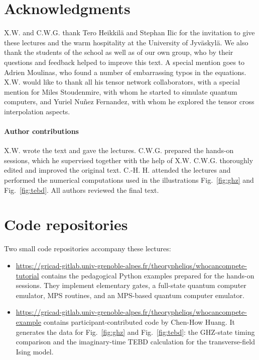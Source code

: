 \documentclass{SciPost}
\begin{document}
\section*{Acknowledgments}
X.W. and C.W.G. thank Tero Heikkilä and Stephan Ilic for the invitation to give these lectures and the warm hospitality at the University of Jyväskylä.
We also thank the students of the school as well as of our own group, who by their questions and feedback helped to improve this text. A special mention goes to Adrien Moulinas, who found a number of embarrassing typos in the equations.  X.W. would like to thank all his tensor network collaborators, with a special mention for Miles Stoudenmire, with whom he started to simulate quantum computers, and Yuriel Nuñez Fernandez, with whom he explored the tensor cross interpolation aspects.

\paragraph{Author contributions}
X.W. wrote the text and gave the lectures. C.W.G. prepared the hands-on sessions, which he supervised together with the help of X.W. C.W.G. thoroughly edited and improved the original text. C.-H. H. attended the lectures and performed the numerical computations used in the illustrations Fig.~\ref{fig:ghz} and Fig.~\ref{fig:tebd}. All authors reviewed the final text.

\appendix

\section{Code repositories}
\label{app:code}

Two small code repositories accompany these lectures:
\begin{itemize}
\item \url{https://gricad-gitlab.univ-grenoble-alpes.fr/theorypheliqs/whocancompete-tutorial} contains the pedagogical Python examples prepared for the hands-on sessions. They implement elementary gates, a full-state quantum computer emulator, MPS routines, and an MPS-based quantum computer emulator.
\item \url{https://gricad-gitlab.univ-grenoble-alpes.fr/theorypheliqs/whocancompete-example} contains participant-contributed code by Chen-How Huang. It generates the data for Fig.~\ref{fig:ghz} and Fig.~\ref{fig:tebd}: the GHZ-state timing comparison and the imaginary-time TEBD calculation for the transverse-field Ising model.
\end{itemize}

\end{document}
